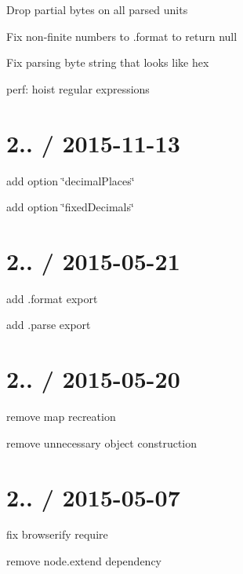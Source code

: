
\begin{DoxyItemize}
\item Drop partial bytes on all parsed units
\item Fix non-\/finite numbers to {\ttfamily .format} to return {\ttfamily null}
\item Fix parsing byte string that looks like hex
\item perf\+: hoist regular expressions
\end{DoxyItemize}

\section*{2.. / 2015-\/11-\/13 }


\begin{DoxyItemize}
\item add option \char`\"{}decimal\+Places\char`\"{}
\item add option \char`\"{}fixed\+Decimals\char`\"{}
\end{DoxyItemize}

\section*{2.. / 2015-\/05-\/21 }


\begin{DoxyItemize}
\item add {\ttfamily .format} export
\item add {\ttfamily .parse} export
\end{DoxyItemize}

\section*{2.. / 2015-\/05-\/20 }


\begin{DoxyItemize}
\item remove map recreation
\item remove unnecessary object construction
\end{DoxyItemize}

\section*{2.. / 2015-\/05-\/07 }


\begin{DoxyItemize}
\item fix browserify require
\item remove node.\+extend dependency
\end{DoxyItemize}

